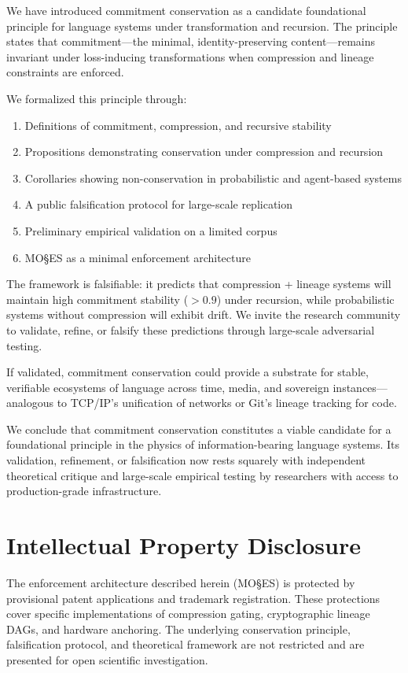 \documentclass[11pt,a4paper]{article}
\begin{document}
We have introduced commitment conservation as a candidate foundational principle for language systems under transformation and recursion. The principle states that commitment---the minimal, identity-preserving content---remains invariant under loss-inducing transformations when compression and lineage constraints are enforced.

We formalized this principle through:
\begin{enumerate}
    \item Definitions of commitment, compression, and recursive stability
    \item Propositions demonstrating conservation under compression and recursion
    \item Corollaries showing non-conservation in probabilistic and agent-based systems
    \item A public falsification protocol for large-scale replication
    \item Preliminary empirical validation on a limited corpus
    \item MO\S{}ES\texttrademark{} as a minimal enforcement architecture
\end{enumerate}

The framework is falsifiable: it predicts that compression + lineage systems will maintain high commitment stability ($>0.9$) under recursion, while probabilistic systems without compression will exhibit drift. We invite the research community to validate, refine, or falsify these predictions through large-scale adversarial testing.

If validated, commitment conservation could provide a substrate for stable, verifiable ecosystems of language across time, media, and sovereign instances---analogous to TCP/IP's unification of networks or Git's lineage tracking for code.

We conclude that commitment conservation constitutes a viable candidate for a foundational principle in the physics of information-bearing language systems. Its validation, refinement, or falsification now rests squarely with independent theoretical critique and large-scale empirical testing by researchers with access to production-grade infrastructure.

\section*{Intellectual Property Disclosure}

The enforcement architecture described herein (MO\S{}ES\texttrademark{}) is protected by provisional patent applications and trademark registration. These protections cover specific implementations of compression gating, cryptographic lineage DAGs, and hardware anchoring. The underlying conservation principle, falsification protocol, and theoretical framework are not restricted and are presented for open scientific investigation.
\end{document}
